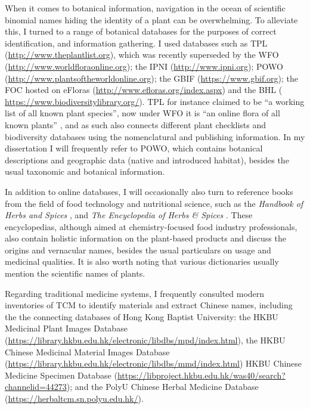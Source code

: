 When it comes to botanical information, navigation in the ocean of scientific binomial names hiding the identity of a plant can be overwhelming. To alleviate this, I turned to a range of botanical databases for the purposes of correct identification, and information gathering. I used databases such as \gls{TPL} (\url{http://www.theplantlist.org}), which was recently superseded by the \gls{WFO} (\url{http://www.worldfloraonline.org}); the \gls{IPNI} (\url{http://www.ipni.org}); \gls{POWO} (\url{http://www.plantsoftheworldonline.org}); the \gls{GBIF} (\url{https://www.gbif.org}); the \gls{FOC} hosted on eFloras (\url{http://www.efloras.org/index.aspx}) and the \gls{BHL} (\url{ https://www.biodiversitylibrary.org/}). \gls{TPL} for instance claimed to be ``a working list of all known plant species'', now under \gls{WFO} it is ``an online flora of all known plants'' , and as such also connects different plant checklists and biodiversity databases using the nomenclatural and publishing information. In my dissertation I will frequently refer to \gls{POWO}, which contains botanical descriptions and geographic data (native and introduced habitat), besides the usual taxonomic and botanical information. 

In addition to online databases, I will occasionally also turn to reference books from the field of food technology and nutritional science, such as the \textit{Handbook of Herbs and Spices} \autocite{peter_handbook_2012,peter_handbook_2006}, and \textit{The Encyclopedia of Herbs \& Spices} \autocite{ravindran_encyclopedia_2017}. These encyclopedias, although aimed at chemistry-focused food industry professionals, also contain holistic information on the plant-based products and discuss the origins and vernacular names, besides the usual particulars on usage and medicinal qualities. It is also worth noting that various dictionaries usually mention the scientific names of plants.

Regarding traditional medicine systems, I frequently consulted modern inventories of \gls{TCM} to identify materials and extract Chinese names, including the the connecting databases of Hong Kong Baptist University: the HKBU Medicinal Plant Images Database (\url{https://library.hkbu.edu.hk/electronic/libdbs/mpd/index.html}), the HKBU Chinese Medicinal Material Images Database (\url{https://library.hkbu.edu.hk/electronic/libdbs/mmd/index.html}) HKBU Chinese Medicine Specimen Database (\url{https://libproject.hkbu.edu.hk/was40/search?channelid=44273}); and the PolyU Chinese Herbal Medicine Database (\url{https://herbaltcm.sn.polyu.edu.hk/}).

